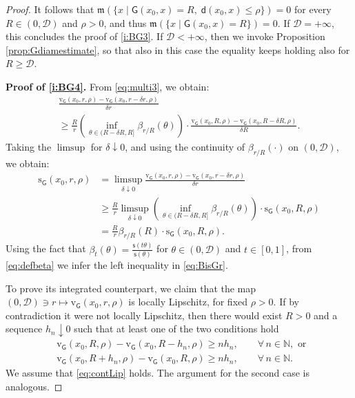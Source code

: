 \documentclass[11pt,a4paper]{article}
\theoremstyle{plain}
\theoremstyle{definition}
\theoremstyle{remark}
\numberwithin{equation}{section}
\newcommand{\N}{\mathbb{N}} %
\newcommand{\cD}{\mathcal{D}}
\newcommand{\sfs}{\mathsf{s}}
\newcommand{\rv}{\mathrm{v}}
\newcommand{\rs}{\mathrm{s}}
\newcommand{\mm}{\mathfrak m}
\newcommand{\sfd}{\mathsf d}
\newcommand{\sfG}{\mathsf G}
\begin{document}
\begin{proof}
It follows that $\mm\left(\{x\mid \sfG(x_{0}, x)= R,\;\sfd(x_0,x)\leq \rho\} \right)=0$ for every $R\in (0,\cD)$ and $\rho>0$, and thus $\mm(\{x\mid \sfG(x_{0}, x)= R \}) =0$.  If $\cD = +\infty$, this concludes the proof of \ref{i:BG3}.  If $\cD<+\infty$, then we invoke Proposition \ref{prop:Gdiamestimate}, so that also in this case the equality keeps holding also for $R\geq \cD$.



\textbf{Proof of \ref{i:BG4}.} From \eqref{eq:multi3}, we obtain:
\begin{multline}\label{eq:PfBG3}
\frac{\rv_{\sfG}(x_0,r,\rho)-\rv_{\sfG}(x_0,r-\delta r,\rho)}{\delta r} \\
\geq \frac{R}{r}\left( \inf_{\theta \in (R-\delta R,R]} \beta_{r/R}(\theta)\right)\cdot \frac{\rv_{\sfG}(x_0,R,\rho)-\rv_{\sfG}(x_0,R-\delta R,\rho)}{\delta R}.
\end{multline}
Taking the $\limsup$ for $\delta \downarrow 0$, and using the continuity of $\beta_{r/R}(\cdot)$ on $(0,\cD)$, we obtain:
\begin{align}
\rs_{\sfG}(x_0,r,\rho)& =\limsup_{\delta \downarrow 0} \frac{\rv_{\sfG}(x_0,r,\rho)-\rv_{\sfG}(x_0,r-\delta r,\rho)}{\delta r} \\
& \geq \frac{R}{r} \limsup_{\delta \downarrow 0} \left(\inf_{\theta \in (R-\delta R,R]} \beta_{r/R}(\theta)\right) \cdot \rs_{\sfG}(x_0,R,\rho) \\
& = \frac{R}{r} \beta_{r/R}(R) \cdot \rs_{\sfG}(x_0,R,\rho).
\end{align}
Using the fact that $\beta_t(\theta) = \frac{\sfs(t\theta)}{\sfs(\theta)}$ for $\theta \in (0,\cD)$ and $t\in [0,1]$, from \eqref{eq:defbeta} we infer the left inequality in \eqref{eq:BisGr}.

To prove its integrated counterpart, we claim that the map $(0,\cD)\ni r\mapsto \rv_{\sfG}(x_{0}, r,\rho)$ is locally Lipschitz,  for fixed $\rho>0$. If by contradiction it were not locally Lipschitz, then there would exist $R>0$ and a sequence $h_{n}\downarrow 0$ such that at least one of the two conditions hold
\begin{align}
&\rv_{\sfG}(x_{0}, R,\rho) -  \rv_{\sfG}(x_{0}, R-h_{n},\rho) \geq n h_{n}, \qquad \forall\, n\in \N, \text{ or } \label{eq:contLip}\\
& \rv_{\sfG}(x_{0}, R+h_{n},\rho) -  \rv_{\sfG}(x_{0}, R,\rho)  \geq n h_{n}, \qquad \forall\, n\in \N. \nonumber
\end{align}
We assume that \eqref{eq:contLip} holds. The argument for the second case is analogous.


\end{proof}
\end{document}

